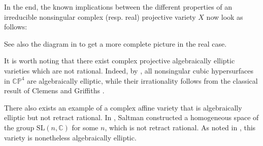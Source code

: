 \documentclass{amsart}
\theoremstyle{plain}
\theoremstyle{definition}
\theoremstyle{remark}
\numberwithin{equation}{section}
\newcommand{\C}{\mathbb{C}}
\begin{document}
In the end, the known implications between the different properties of an irreducible nonsingular complex (resp. real) projective variety $X$ now look as follows:
\begin{center}
\end{center}
See also the diagram in \cite[p. 5]{RelativeSW} to get a more complete picture in the real case.

It is worth noting that there exist complex projective algebraically elliptic varieties which are not rational. Indeed, by \cite[Theorem 1.1]{cubic}, all nonsingular cubic hypersurfaces in $\C\mathbb{P}^4$ are algebraically elliptic, while their irrationality follows from the classical result of Clemens and Griffiths \cite{clemens-griffiths}.

There also exists an example of a complex affine variety that is algebraically elliptic but not retract rational. In \cite[Theorem 3.6]{Saltman1984}, Saltman constructed a homogeneous space of the group $\mathrm{SL}(n,\C)$ for some $n$, which is not retract rational. As noted in \cite[p. 2]{cubic}, this variety is nonetheless algebraically elliptic.
\end{document}
